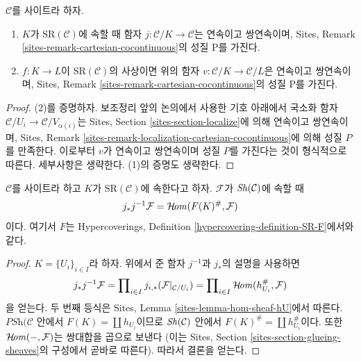 \begin{lemma}
\label{lemma-has-P}
$\mathcal{C}$를 사이트라 하자.
\begin{enumerate}
\item $K$가 $\text{SR}(\mathcal{C})$에 속할 때 함자
$j : \mathcal{C}/K \to \mathcal{C}$는 연속이고 쌍연속이며,
Sites, Remark \ref{sites-remark-cartesian-cocontinuous}의 성질 P를 가진다.
\item $f : K \to L$이 $\text{SR}(\mathcal{C})$의 사상이면 위의 함자
$v : \mathcal{C}/K \to \mathcal{C}/L$은 연속이고 쌍연속이며,
Sites, Remark \ref{sites-remark-cartesian-cocontinuous}의 성질 P를 가진다.
\end{enumerate}
\end{lemma}

\begin{proof}
(2)를 증명하자. 보조정리 앞의 논의에서 사용한 기호 아래에서
국소화 함자 $\mathcal{C}/U_i \to \mathcal{C}/V_{\alpha(i)}$는
Sites, Section \ref{sites-section-localize}에 의해 연속이고 쌍연속이며,
Sites, Remark
\ref{sites-remark-localization-cartesian-cocontinuous}에 의해
성질 $P$를 만족한다. 이로부터 $v$가 연속이고 쌍연속이며 성질 $P$를
가진다는 것이 형식적으로 따른다. 세부사항은 생략한다.
(1)의 증명도 생략한다.
\end{proof}

\begin{lemma}
\label{lemma-push-pull-localization}
$\mathcal{C}$를 사이트라 하고 $K$가 $\text{SR}(\mathcal{C})$에
속한다고 하자. $\mathcal{F}$가 $\mathop{\mathit{Sh}}\nolimits(\mathcal{C})$에 속할 때
$$
j_*j^{-1}\mathcal{F} = \mathop{\mathcal{H}\!\mathit{om}}\nolimits(F(K)^\#, \mathcal{F})
$$
이다. 여기서 $F$는 Hypercoverings, Definition
\ref{hypercovering-definition-SR-F}에서와 같다.
\end{lemma}

\begin{proof}
$K = \{U_i\}_{i \in I}$라 하자.
위에서 준 함자 $j^{-1}$과 $j_*$의 설명을 사용하면
$$
j_*j^{-1}\mathcal{F} =
\prod\nolimits_{i \in I} j_{i, *}(\mathcal{F}|_{\mathcal{C}/U_i}) =
\prod\nolimits_{i \in I} \mathop{\mathcal{H}\!\mathit{om}}\nolimits(h_{U_i}^\#, \mathcal{F})
$$
을 얻는다. 두 번째 등식은 Sites, Lemma
\ref{sites-lemma-hom-sheaf-hU}에서 따른다.
$\textit{PSh}(\mathcal{C}$ 안에서
$F(K) = \coprod h_{U_i}$이므로 $\mathop{\mathit{Sh}}\nolimits(\mathcal{C})$ 안에서
$F(K)^\# = \coprod h_{U_i}^\#$이다. 또한
$\mathop{\mathcal{H}\!\mathit{om}}\nolimits(-, \mathcal{F})$는 쌍대합을 곱으로 보낸다
(이는 Sites, Section \ref{sites-section-glueing-sheaves}의
구성에서 곧바로 따른다). 따라서 결론을 얻는다.
\end{proof}

